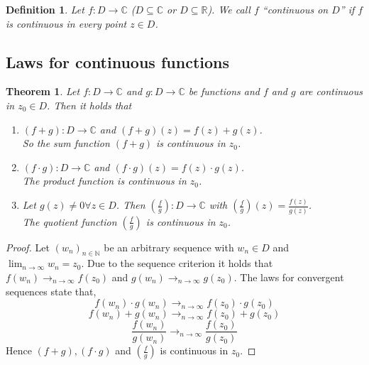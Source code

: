 \documentclass[a4paper,landscape,twocolumn]{article}
\newtheorem{theorem}{Theorem}
\newtheorem{defi}{Definition}
\newcommand\seq[1]{{\left(#1\right)}_{n \in \mathbb N}}
\begin{document}
\begin{defi}
  Let $f: D \rightarrow \mathbb C$ ($D \subseteq \mathbb C$ or $D \subseteq \mathbb R$).
  We call $f$ \enquote{\emph{continuous on $D$}} if $f$ is continuous in every point $z \in D$.
\end{defi}

\subsection{Laws for continuous functions}
%
\begin{theorem}
  Let $f: D \rightarrow \mathbb C$ and $g: D \rightarrow \mathbb C$ be functions
  and $f$ and $g$ are continuous in $z_0 \in D$. Then it holds that
  \begin{enumerate}
    \item $(f + g): D \to \mathbb C$ and $(f + g)(z) = f(z) + g(z)$. \\
      So the sum function $(f + g)$ is continuous in $z_0$.
    \item $(f \cdot g): D \rightarrow \mathbb C$ and $(f \cdot g)(z) = f(z) \cdot g(z)$. \\
      The product function is continuous in $z_0$.
    \item Let $g(z) \neq 0 \forall z \in D$. Then $\left(\frac{f}{g}\right): D \rightarrow \mathbb C$
      with $\left(\frac fg\right)(z) = \frac{f(z)}{g(z)}$. \\
      The quotient function $\left(\frac fg\right)$ is continuous in $z_0$.
  \end{enumerate}
\end{theorem}
\begin{proof}
  Let $\seq{w_n}$ be an arbitrary sequence with $w_n \in D$
  and $\lim_{n\to\infty} w_n = z_0$. Due to the sequence criterion
  it holds that $f(w_n) \to_{n\to\infty} f(z_0)$ and $g(w_n) \to_{n\to\infty} g(z_0)$.
  The laws for convergent sequences state that,
  \[ f(w_n) \cdot g(w_n) \to_{n\to\infty} f(z_0) \cdot g(z_0) \]
  \[ f(w_n) + g(w_n) \to_{n\to\infty} f(z_0) + g(z_0) \]
  \[ \frac{f(w_n)}{g(w_n)} \to_{n\to\infty} \frac{f(z_0)}{g(z_0)} \]
  Hence $(f + g), (f \cdot g)$ and $\left(\frac fg\right)$ is continuous in $z_0$.
\end{proof}
\end{document}
